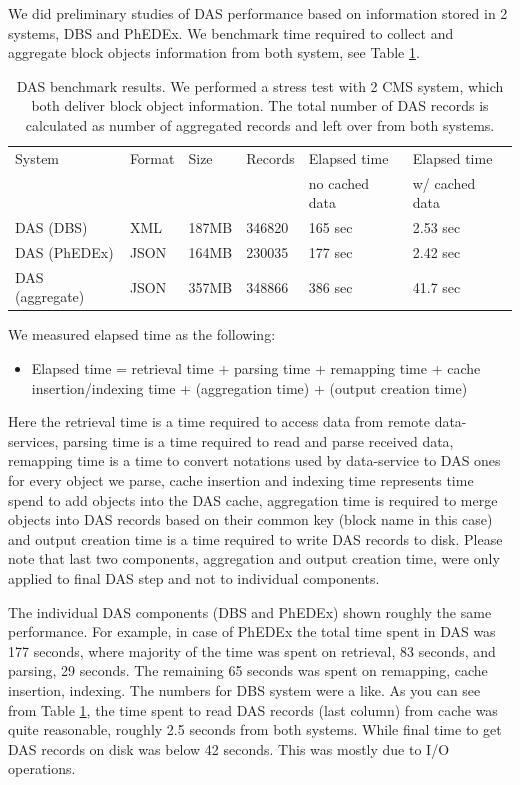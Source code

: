 \documentclass[a4paper]{jpconf}
\begin{document}
We did preliminary studies of DAS performance based on information stored
in 2 systems, DBS and PhEDEx. We benchmark time required to collect and 
aggregate block objects information from both system, see Table \ref{DAS_benchmark}.

\begin{table}[hbt]
\centering
\begin{tabular}{llllll}\hline
\hline

System & Format & Size & Records & Elapsed time & Elapsed time \\
& & & & no cached data & w/ cached data \\
\hline
DAS (DBS) & XML & 187MB & 346820 & 165 sec & 2.53 sec \\
DAS (PhEDEx) & JSON & 164MB & 230035 & 177 sec & 2.42 sec \\
DAS (aggregate) & JSON & 357MB & 348866 & 386 sec & 41.7 sec \\
\hline
\hline
\end{tabular}
\caption{DAS benchmark results. We performed a stress test with 2 CMS system, which
both deliver block object information. The total number of DAS records is calculated
as number of aggregated records and left over from both systems.}
\label{DAS_benchmark}
\end{table}

We measured elapsed time as the following:
\begin{itemize}
\item[]
Elapsed time = retrieval time + parsing time + remapping time 
        + cache insertion/indexing time 
        + (aggregation time) + (output creation time)
\end{itemize}
Here the retrieval time is a time required to access data from remote data-services,
parsing time is a time required to read and parse received data, remapping time
is a time to convert notations used by data-service to DAS ones for every object
we parse, cache insertion and indexing time represents time spend to add objects into
the DAS cache, aggregation time is required to merge objects into DAS records based
on their common key (block name in this case) and output creation time 
is a time required to write DAS records to disk. Please note that last two
components, aggregation and output creation time, were only applied to
final DAS step and not to individual components.

The individual DAS components (DBS and PhEDEx) shown roughly the same performance.
For example, in case of PhEDEx the total time spent in DAS was 177 seconds, where
majority of the time was spent on retrieval, 83 seconds, and parsing, 29 seconds.
The remaining 65 seconds was spent on remapping, cache insertion, indexing. The
numbers for DBS system were a like. As you can see from Table \ref{DAS_benchmark},
the time spent to read DAS records (last column) from cache was quite
reasonable, roughly 2.5 seconds from both systems. While final time to
get DAS records on disk was below 42 seconds. This was mostly due to I/O operations.
\end{document}

